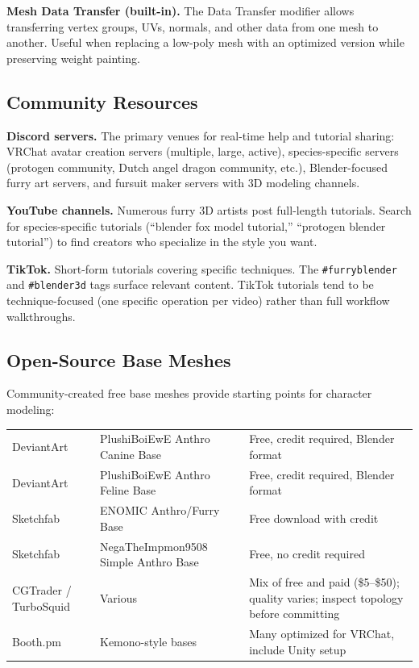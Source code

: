 \textbf{Mesh Data Transfer (built-in).} The Data Transfer modifier allows transferring vertex groups, UVs, normals, and other data from one mesh to another. Useful when replacing a low-poly mesh with an optimized version while preserving weight painting.


\subsection{Community Resources}

\textbf{Discord servers.} The primary venues for real-time help and tutorial sharing: VRChat avatar creation servers (multiple, large, active), species-specific servers (protogen community, Dutch angel dragon community, etc.), Blender-focused furry art servers, and fursuit maker servers with 3D modeling channels.

\textbf{YouTube channels.} Numerous furry 3D artists post full-length tutorials. Search for species-specific tutorials (``blender fox model tutorial,'' ``protogen blender tutorial'') to find creators who specialize in the style you want.

\textbf{TikTok.} Short-form tutorials covering specific techniques. The \texttt{\#furryblender} and \texttt{\#blender3d} tags surface relevant content. TikTok tutorials tend to be technique-focused (one specific operation per video) rather than full workflow walkthroughs.


\subsection{Open-Source Base Meshes}

Community-created free base meshes provide starting points for character modeling:

\begin{center}
\begin{tabularx}{\textwidth}{L{3cm}L{3cm}X}
\toprule
{}
 &  &  \\
\midrule
DeviantArt & PlushiBoiEwE Anthro Canine Base & Free, credit required, Blender format \\
DeviantArt & PlushiBoiEwE Anthro Feline Base & Free, credit required, Blender format \\
Sketchfab & ENOMIC Anthro/Furry Base & Free download with credit \\
Sketchfab & NegaTheImpmon9508 Simple Anthro Base & Free, no credit required \\
CGTrader / TurboSquid & Various & Mix of free and paid (\$5--\$50); quality varies; inspect topology before committing \\
Booth.pm & Kemono-style bases & Many optimized for VRChat, include Unity setup \\
\bottomrule
\end{tabularx}
\end{center}


